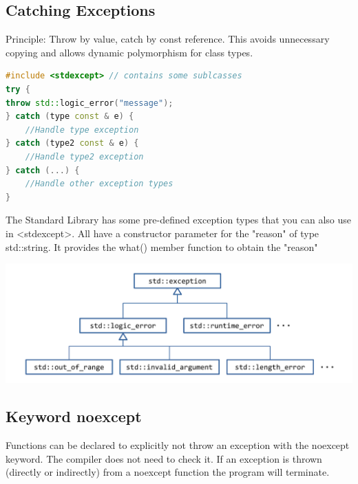\subsection{Catching Exceptions}
Principle: Throw by value, catch by const reference. This avoids unnecessary copying and allows dynamic polymorphism for class types.
\begin{lstlisting}[language=C++]
#include <stdexcept> // contains some sublcasses
try {
throw std::logic_error("message");
} catch (type const & e) {
	//Handle type exception 
} catch (type2 const & e) {
	//Handle type2 exception 
} catch (...) {
	//Handle other exception types 
}
\end{lstlisting}
The Standard Library has some pre-defined exception types that you can also use in <stdexcept>. All have a constructor parameter for the "reason" of type std::string. It provides the what() member function to obtain the "reason"
\begin{center}
	\includegraphics[width=0.75\linewidth]{images/exceptions}
\end{center}

\subsection{Keyword noexcept}
Functions can be declared to explicitly not throw an exception with the noexcept keyword. The compiler does not need to check it.  If an exception is thrown (directly or indirectly) from a noexcept function the program will terminate.

